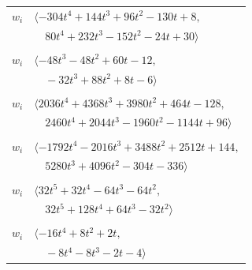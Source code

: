 \documentclass[11pt]{article}
\begin{document}
\begin{longtable}{@{}ll@{}}
$w_i$ & $\langle -304t^{4}+144t^{3}+96t^{2}-130t+8,$\\
 & $\quad 80t^{4}+232t^{3}-152t^{2}-24t+30\rangle$\\
\addlinespace[2pt]
\multicolumn{2}{@{}p{0.97\textwidth}@{}}{$i=69$, $D_i=2$, $e_i=2$, $\rho_{ij}$: $3{:}2, \allowbreak 5{:}2, \allowbreak 29{:}2, \allowbreak 35{:}2, \allowbreak 65{:}2, \allowbreak 68{:}2$}\\
$w_i$ & $\langle -48t^{3}-48t^{2}+60t-12,$\\
 & $\quad -32t^{3}+88t^{2}+8t-6\rangle$\\
\addlinespace[2pt]
\multicolumn{2}{@{}p{0.97\textwidth}@{}}{$i=70$, $D_i=1$, $\rho_{ij}$: $0{:}1, \allowbreak 8{:}3, \allowbreak 12{:}3, \allowbreak 24{:}2, \allowbreak 34{:}3, \allowbreak 37{:}3, \allowbreak 42{:}3, \allowbreak 43{:}2, \allowbreak 45{:}3, \allowbreak 58{:}2, \allowbreak 68{:}3, \allowbreak 71{:}2$}\\
$w_i$ & $\langle 2036t^{4}+4368t^{3}+3980t^{2}+464t-128,$\\
 & $\quad 2460t^{4}+2044t^{3}-1960t^{2}-1144t+96\rangle$\\
\addlinespace[2pt]
\multicolumn{2}{@{}p{0.97\textwidth}@{}}{$i=71$, $D_i=1$, $e_i=1$, $\rho_{ij}$: $5{:}1, \allowbreak 7{:}3, \allowbreak 38{:}3, \allowbreak 46{:}3, \allowbreak 47{:}1, \allowbreak 48{:}3, \allowbreak 52{:}1, \allowbreak 70{:}2$}\\
$w_i$ & $\langle -1792t^{4}-2016t^{3}+3488t^{2}+2512t+144,$\\
 & $\quad 5280t^{3}+4096t^{2}-304t-336\rangle$\\
\addlinespace[2pt]
\multicolumn{2}{@{}p{0.97\textwidth}@{}}{$i=72$, $D_i=2$, $e_i=3$, $\rho_{ij}$: $0{:}2, \allowbreak 1{:}2, \allowbreak 3{:}3, \allowbreak 4{:}1, \allowbreak 20{:}2, \allowbreak 25{:}1, \allowbreak 31{:}3, \allowbreak 53{:}3, \allowbreak 58{:}1, \allowbreak 62{:}1, \allowbreak 64{:}1$}\\
$w_i$ & $\langle 32t^{5}+32t^{4}-64t^{3}-64t^{2},$\\
 & $\quad 32t^{5}+128t^{4}+64t^{3}-32t^{2}\rangle$\\
\addlinespace[2pt]
\multicolumn{2}{@{}p{0.97\textwidth}@{}}{$i=73$, $D_i=1$, $\rho_{ij}$: $5{:}3, \allowbreak 6{:}2, \allowbreak 14{:}1, \allowbreak 16{:}3, \allowbreak 27{:}1, \allowbreak 31{:}2, \allowbreak 36{:}2, \allowbreak 40{:}1, \allowbreak 44{:}1, \allowbreak 61{:}1$}\\
$w_i$ & $\langle -16t^{4}+8t^{2}+2t,$\\
 & $\quad -8t^{4}-8t^{3}-2t-4\rangle$\\

\end{longtable}
\end{document}

